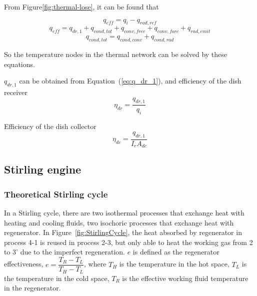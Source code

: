 From Figure\ref{fig:thermal-lose}, it can be found that

\begin{equation}
  q_{eff} = q_i - q_{rad,ref}
\end{equation}
\begin{equation}
  q_{eff} = q_{dr,1} + q_{cond,tot} + q_{conv,free} + q_{conv,forc}+q_{rad,emit}
\end{equation}
\begin{equation}
  q_{cond,tot} = q_{cond,conv}+q_{cond,rad}
\end{equation}

So the temperature nodes in the thermal network can be solved by these equations.

$q_{dr,1}$ can be obtained from Equation~(\ref{eq:q_dr_1}), and efficiency of the dish receiver
\begin{equation}
  \eta_{dr} = \frac{q_{dr,1}}{q_i}
\end{equation}

Efficiency of the dish collector
\begin{equation}
  \eta_{dc} = \frac{q_{dr,1}}{I_rA_{dc}}
\end{equation}

\subsection{Stirling engine}\label{sec:StirlingEngineModel}
\subsubsection{Theoretical Stirling cycle}
In a Stirling cycle, there are two isothermal processes that exchange heat with heating and cooling fluids, two isochoric processes that exchange heat with regenerator. In Figure~\ref{fig:StirlingCycle}, the heat absorbed by regenerator in process 4-1 is reused in process 2-3, but only able to heat the working gas from 2 to 3' due to the imperfect regeneration. $e$ is defined as the regenerator effectiveness\cite{Formosa2010,Juhasz2010}, $e=\dfrac{T_R-T_L}{T_H-T_L}$, where $T_H$ is the temperature in the hot space, $T_L$ is the temperature in the cold space, $T_R$ is the effective working fluid temperature in the regenerator.

